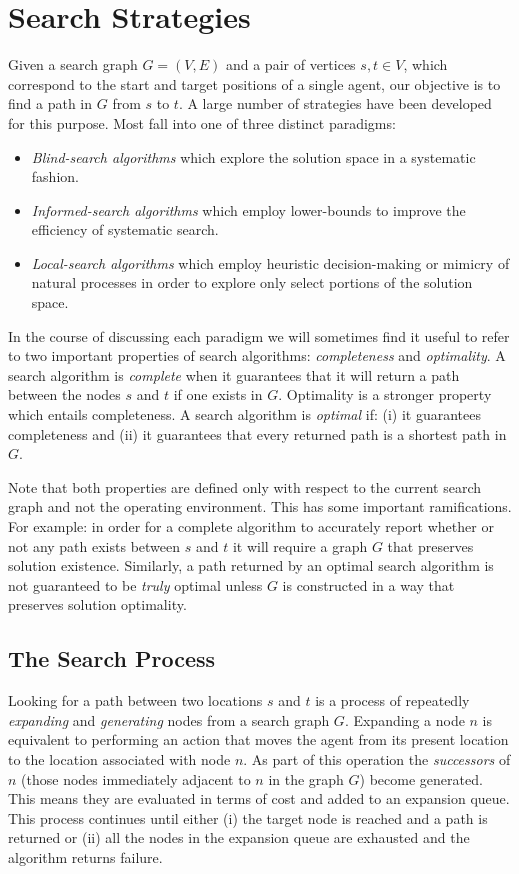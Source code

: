 \section{Search Strategies}
\label{cha::lit::search}
Given a search graph $G = (V, E)$ and a pair of vertices $s, t \in V$, which 
correspond to the start and target positions of a single agent, 
our objective is to find a path in $G$ from $s$ to $t$.
A large number of strategies have been developed for this purpose. Most fall into
one of three distinct paradigms:
\begin{itemize}
\item{\emph{Blind-search algorithms} which explore the solution space in a systematic fashion.}
\item{\emph{Informed-search algorithms} which employ lower-bounds to improve the 
efficiency of systematic search.}
\item{\emph{Local-search algorithms} which employ heuristic decision-making or mimicry of
natural processes in order to explore only select portions of the solution space.}
\end{itemize}

In the course of discussing each paradigm we will sometimes
find it useful to refer to two important properties of search algorithms: \emph{completeness} 
and \emph{optimality}.
A search algorithm is \emph{complete} when it guarantees that it will return a
path between the nodes $s$ and $t$ if one exists in $G$.
Optimality is a stronger property which entails completeness.
A search algorithm is \emph{optimal} if: (i) it guarantees completeness and (ii)
it guarantees that every returned path is a shortest path in $G$.

Note that both properties are defined only with respect to the current search graph and 
not the operating environment.
This has some important ramifications. For example: 
in order for a complete algorithm to accurately report whether or not any path exists between 
$s$ and $t$ it will require a graph $G$ that preserves solution existence.
Similarly, a path returned by an optimal search algorithm
is not guaranteed to be \emph{truly} optimal unless $G$ is constructed in a way that 
preserves solution optimality.

\subsection{The Search Process}
\label{cha::lit::search:terms}
Looking for a path between two locations $s$ and $t$ is a process of repeatedly
\emph{expanding} and \emph{generating} nodes from a search graph $G$.
Expanding a node $n$ is equivalent to performing an action that moves the agent 
from its present location to the location associated with node $n$.
As part of this operation the \emph{successors} of $n$ (those nodes immediately 
adjacent to $n$ in the graph $G$) become generated. This means they are evaluated 
in terms of cost and added to an expansion queue. 
This process continues until either (i)
the target node is reached and a path is returned or (ii) all the nodes in the
expansion queue are exhausted and the algorithm returns failure.

